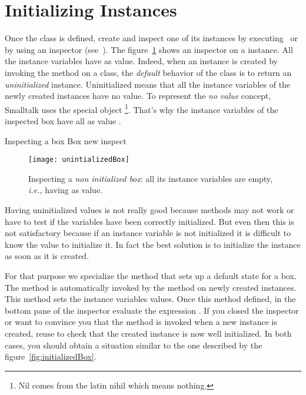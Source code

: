 \section{Initializing Instances}\label{sec:initializeInstance}

Once the class is defined, create and inspect one of its instances by
executing~ or by using an inspector (see~).  The
figure~\ref{fig:uninitializedBox} shows an inspector on a 
instance.  All the instance variables have  as
value.  Indeed, when an instance is created by invoking the method
 on a class, the \emph{default} behavior of the
class is to return an \emph{uninitialized}
instance.  Uninitialized means that all the
instance variables of the newly created instances have no value.  To
represent the \emph{no value} concept, Smalltalk  uses the special object 
\footnote{Nil comes from the latin nihil which means
nothing.}.  That's why the instance variables of the inspected box
have all as value .

\begin{scriptwithtitle}{Inspecting a box}\label{scr:box}
Box new inspect
\end{scriptwithtitle}

\begin{figure}
\begin{center}
\texttt{[image: unintializedBox]}
\caption{Inspecting a \emph{non initialized box}: all its instance variables 
are empty, \emph{i.e.,} having  as value.\label{fig:uninitializedBox}}
\end{center}
\end{figure}

Having uninitialized values is not really good because methods may not
work or have to test if the variables have been correctly initialized. 
But even then this is not satisfactory because if an instance variable
is not initialized it is difficult to know the value to initialize it. 
In fact the best solution is to initialize the instance as soon as it
is created.  



For that purpose we specialize the method  that sets up
a default state for a box.  The method  is
automatically invoked by the method  on newly created
instances.  This method sets the instance variables values.  Once this
method defined, in the bottom pane of the inspector evaluate the expression 
. If you closed the inspector or want to convince you that the method 
is invoked when a new instance is created,  reuse  to check that the created
instance is now well initialized. In both cases, you should obtain a situation 
similar to the one described by the figure~\ref{fig:initializedBox}.


